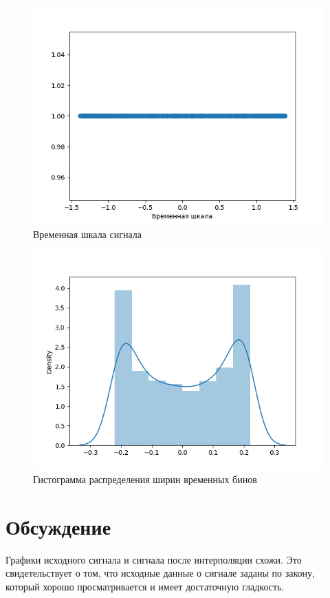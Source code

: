 \documentclass[12pt,a4paper]{article}
\begin{document}
\begin{figure}[H]
    \centering
    \includegraphics[scale=0.8]{images/time.png}
    \caption{Временная шкала сигнала}
\end{figure}

\begin{figure}[H]
    \centering
    \includegraphics[scale=0.8]{images/hist.png}
    \caption{Гистограмма распределения ширин временных бинов}
\end{figure}

\section{Обсуждение}
Графики исходного сигнала и сигнала после интерполяции схожи. Это свидетельствует о том, что исходные данные о сигнале заданы по закону, который хорошо просматривается и имеет достаточную гладкость.
\end{document}

